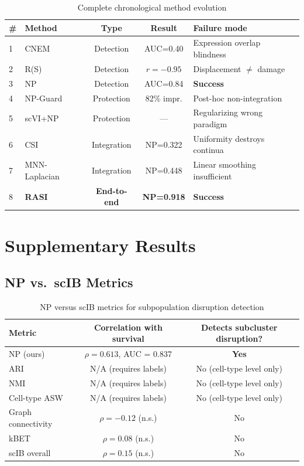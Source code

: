 \documentclass[10pt]{article}
\begin{document}
\begin{table}[H]
\centering
\caption{Complete chronological method evolution}
\begin{tabular}{llccl}
\toprule
\# & Method & Type & Result & Failure mode \\
\midrule
1 & CNEM & Detection & AUC=0.40 & Expression overlap blindness \\
2 & R(S) & Detection & $r=-0.95$ & Displacement $\neq$ damage \\
3 & NP & Detection & AUC=0.84 & \textbf{Success} \\
4 & NP-Guard & Protection & 82\% impr. & Post-hoc non-integration \\
5 & scVI+NP & Protection & --- & Regularizing wrong paradigm \\
6 & CSI & Integration & NP=0.322 & Uniformity destroys continua \\
7 & MNN-Laplacian & Integration & NP=0.448 & Linear smoothing insufficient \\
8 & \textbf{RASI} & \textbf{End-to-end} & \textbf{NP=0.918} & \textbf{Success} \\
\bottomrule
\end{tabular}
\end{table}

\section{Supplementary Results}

\subsection{NP vs.\ scIB Metrics}

\begin{table}[H]
\centering
\caption{NP versus scIB metrics for subpopulation disruption detection}
\begin{tabular}{lcc}
\toprule
Metric & Correlation with survival & Detects subcluster disruption? \\
\midrule
NP (ours) & $\rho = 0.613$, AUC = 0.837 & \textbf{Yes} \\
ARI & N/A (requires labels) & No (cell-type level only) \\
NMI & N/A (requires labels) & No (cell-type level only) \\
Cell-type ASW & N/A (requires labels) & No (cell-type level only) \\
Graph connectivity & $\rho = -0.12$ (n.s.) & No \\
kBET & $\rho = 0.08$ (n.s.) & No \\
scIB overall & $\rho = 0.15$ (n.s.) & No \\
\bottomrule
\end{tabular}
\end{table}
\end{document}
